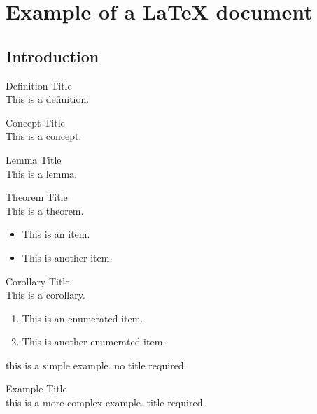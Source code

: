 \section{Example of a LaTeX document}

\subsection{Introduction}

\begin{definition}{Definition Title}\\
    This is a definition.
\end{definition}

\begin{concept}{Concept Title}\\
    This is a concept.
\end{concept}

\begin{lemma}{Lemma Title}\\
    This is a lemma.
\end{lemma}

\begin{theorem}{Theorem Title}\\
    This is a theorem.
    \begin{itemize}
        \item This is an item.
        \item This is another item.
    \end{itemize}
\end{theorem}

\begin{corollary}{Corollary Title}\\
    This is a corollary.
    \begin{enumerate}
        \item This is an enumerated item.
        \item This is another enumerated item.
    \end{enumerate}
\end{corollary}

\begin{example}
    this is a simple example. no title required.
\end{example}

\begin{example2}{Example Title}\\
    this is a more complex example. title required.
\end{example2}

